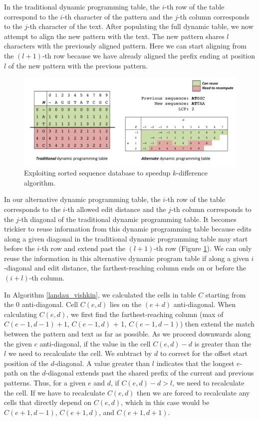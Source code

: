 In the traditional dynamic programming table, the $i$-th row of the table correspond to the $i$-th character of the pattern and the $j$-th column corresponds to the $j$-th character of the text.
After populating the full dynamic table, we now attempt to align the new pattern with the text.
The new pattern shares $l$ characters with the previously aligned pattern.
Here we can start aligning from the $(l+1)$-th row because we have already aligned the prefix ending at position $l$ of the new pattern with the previous pattern.


\begin{figure}[tb]
  \centering
    \includegraphics[width=1.0\textwidth]{work_saving}
  \caption{Exploiting sorted sequence database to speedup $k$-difference algorithm.}
  \label{fig:work_saving}
\end{figure}


In our alternative dynamic programming table, the $i$-th row of the table corresponds to the $i$-th allowed edit distance and the $j$-th column corresponds to the $j$-th diagonal of the traditional dynamic programming table.
It becomes trickier to reuse information from this dynamic programming table because edits along a given diagonal in the traditional dynamic programming table may start before the $i$-th row and extend past the $(l+1)$-th row (Figure \ref{fig:work_saving}).
We can only reuse the information in this alternative dynamic program table if along a given $i$-diagonal and edit distance, the farthest-reaching column ends on or before the $(i+l)$-th column.

In Algorithm \ref{landau_vishkin}, we calculated the cells in table $C$ starting from the 0 anti-diagonal.  Cell $C(e,d)$ lies on the $(e+d)$ anti-diagonal.
When calculating $C(e,d)$, we first find the farthest-reaching column (max of $C(e-1,d-1) + 1$, $C(e-1,d)$ + 1, $C(e-1,d-1)$) then extend the match between the pattern and text as far as possible.
As we proceed downwards along the given $c$ anti-diagonal, if the value in the cell $C(e,d) - d$ is greater than the $l$ we need to recalculate the cell.
We subtract by $d$ to correct for the offset start position of the $d$-diagonal.
A value greater than $l$ indicates that the longest $e$-path on the $d$-diagonal extends past the shared prefix of the current and previous patterns.
Thus, for a given $e$ and $d$, if $C(e,d) - d > l$, we need to recalculate the cell.
If we have to recalculate $C(e,d)$ then we are forced to recalculate any cells that directly depend on $C(e,d)$, which in this case would be $C(e+1, d-1)$, $C(e+1, d)$, and $C(e+1, d+1)$.

